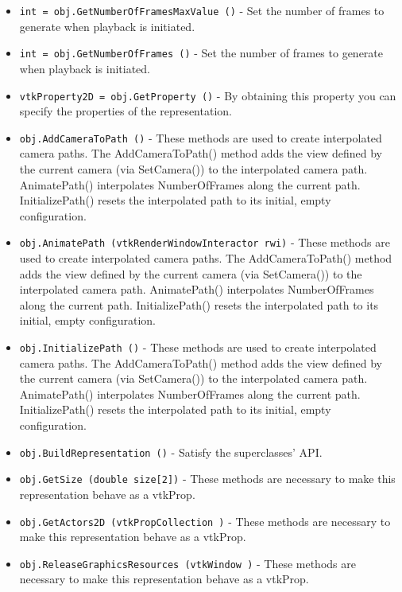 \begin{itemize}
\item  \verb|int = obj.GetNumberOfFramesMaxValue ()| -  Set the number of frames to generate when playback is initiated.

\item  \verb|int = obj.GetNumberOfFrames ()| -  Set the number of frames to generate when playback is initiated.

\item  \verb|vtkProperty2D = obj.GetProperty ()| -  By obtaining this property you can specify the properties of the 
 representation.

\item  \verb|obj.AddCameraToPath ()| -  These methods are used to create interpolated camera paths.  The
 AddCameraToPath() method adds the view defined by the current camera
 (via SetCamera()) to the interpolated camera path. AnimatePath()
 interpolates NumberOfFrames along the current path. InitializePath()
 resets the interpolated path to its initial, empty configuration.

\item  \verb|obj.AnimatePath (vtkRenderWindowInteractor rwi)| -  These methods are used to create interpolated camera paths.  The
 AddCameraToPath() method adds the view defined by the current camera
 (via SetCamera()) to the interpolated camera path. AnimatePath()
 interpolates NumberOfFrames along the current path. InitializePath()
 resets the interpolated path to its initial, empty configuration.

\item  \verb|obj.InitializePath ()| -  These methods are used to create interpolated camera paths.  The
 AddCameraToPath() method adds the view defined by the current camera
 (via SetCamera()) to the interpolated camera path. AnimatePath()
 interpolates NumberOfFrames along the current path. InitializePath()
 resets the interpolated path to its initial, empty configuration.

\item  \verb|obj.BuildRepresentation ()| -  Satisfy the superclasses' API.

\item  \verb|obj.GetSize (double size[2])| -  These methods are necessary to make this representation behave as
 a vtkProp.

\item  \verb|obj.GetActors2D (vtkPropCollection )| -  These methods are necessary to make this representation behave as
 a vtkProp.

\item  \verb|obj.ReleaseGraphicsResources (vtkWindow )| -  These methods are necessary to make this representation behave as
 a vtkProp.


\end{itemize}
